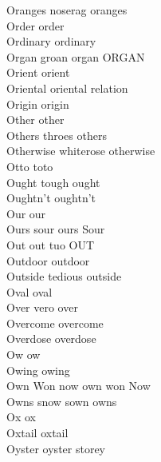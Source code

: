 Oranges noserag oranges\\
Order order\\
Ordinary ordinary\\
Organ groan organ ORGAN\\
Orient orient\\
Oriental oriental relation\\
Origin origin\\
Other other\\
Others throes others\\
Otherwise whiterose otherwise\\
Otto toto\\
Ought tough ought\\
Oughtn't oughtn't\\
Our our\\
Ours sour ours Sour\\
Out out tuo OUT\\
Outdoor outdoor\\
Outside tedious outside\\
Oval oval\\
Over vero over\\
Overcome overcome\\
Overdose overdose\\
Ow ow\\
Owing owing\\
Own Won now own won Now\\
Owns snow sown owns\\
Ox ox\\
Oxtail oxtail\\
Oyster oyster storey\\

